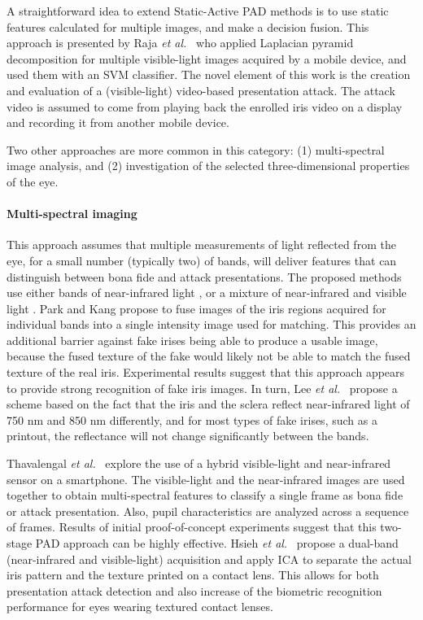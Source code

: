 \documentclass[format=acmsmall, review=false, timestamp=false]{acmart}
\newcommand{\etal}{{\it et al.}~}
\begin{document}
A straightforward idea to extend {Static-Active} PAD methods is to use static features calculated for multiple images, and make a decision fusion. This approach is presented by Raja \etal \cite{Raja_BTAS_2015} who applied Laplacian pyramid decomposition for multiple visible-light images acquired by a mobile device, and used them with an SVM classifier. The novel element of this work is the creation and evaluation of a (visible-light) video-based presentation attack. The attack video is assumed to come from playing back the enrolled iris video on a display and recording it from another mobile device. 

Two other approaches are more common in this category: (1) multi-spectral image analysis, and (2) investigation of the selected three-dimensional properties of the eye.

\paragraph{Multi-spectral imaging}

This approach assumes that multiple measurements of light reflected from the eye, for a small number (typically two) {of} bands, will deliver features that can distinguish between bona fide and attack {presentations}. The proposed methods use either bands of near-infrared light \cite{Park_LNCS_2005,Park_OptEng_2007,Lee_BS_2006}, or a mixture of near-infrared and visible light \cite{Chen_PRL_2012,Thavalengal_TCE_2016,Hsieh_Sensors_2018}. Park and Kang \cite{Park_LNCS_2005,Park_OptEng_2007} propose to fuse images of the iris regions acquired for individual bands into a single intensity image used for matching. This provides an additional barrier against fake irises being able to produce a usable image, because the fused texture of the fake would likely not be able to match the fused texture of the real iris. Experimental results suggest that this approach appears to provide strong {recognition of fake} iris images. In turn, Lee \etal \cite{Lee_BS_2006} propose a scheme based on the fact that the iris and the sclera reflect near-infrared light of 750 nm and 850 nm differently, and for most types of {fake} irises, such as a printout, the reflectance will not change significantly between the bands. 

Thavalengal \etal \cite{Thavalengal_TCE_2016} explore the use of a hybrid visible-light and near-infrared sensor on a smartphone. The visible-light and the near-{infrared} images are used together to obtain multi-spectral features to classify a single frame as bona fide or attack {presentation}. Also, pupil characteristics are analyzed across a sequence of frames. Results of initial proof-of-concept experiments suggest that this two-stage {PAD} approach can be highly effective. Hsieh \etal \cite{Hsieh_Sensors_2018} propose a dual-band (near-infrared and visible-light) acquisition and apply ICA to separate the actual iris pattern and the texture printed on a contact lens. This allows for both presentation {attack} detection and also increase of the biometric recognition performance for eyes wearing textured contact lenses.
\end{document}
